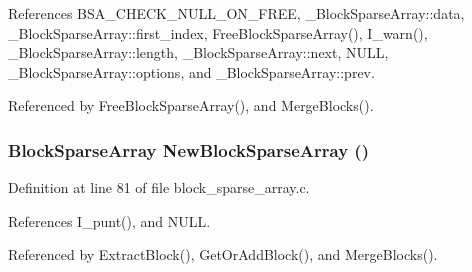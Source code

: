 References BSA\_\-CHECK\_\-NULL\_\-ON\_\-FREE, \_\-Block\-Sparse\-Array::data, \_\-Block\-Sparse\-Array::first\_\-index, Free\-Block\-Sparse\-Array(), I\_\-warn(), \_\-Block\-Sparse\-Array::length, \_\-Block\-Sparse\-Array::next, NULL, \_\-Block\-Sparse\-Array::options, and \_\-Block\-Sparse\-Array::prev.

Referenced by Free\-Block\-Sparse\-Array(), and Merge\-Blocks().
\subsubsection{\setlength{\rightskip}{0pt plus 5cm}\bf{Block\-Sparse\-Array} New\-Block\-Sparse\-Array ()}\label{block__sparse__array_8h_4070ef3b8cd4519b49811f88002197a5}




Definition at line 81 of file block\_\-sparse\_\-array.c.

References I\_\-punt(), and NULL.

Referenced by Extract\-Block(), Get\-Or\-Add\-Block(), and Merge\-Blocks().